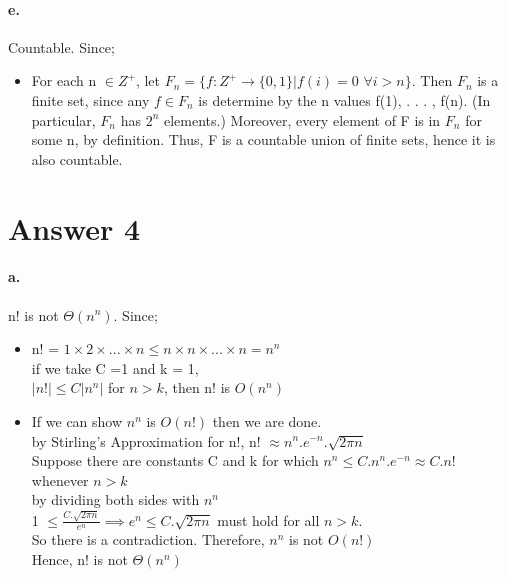 \documentclass[11pt]{article}
\begin{document}
\paragraph{e.}
Countable. Since;
\begin{itemize}
    \item For each n $\in Z^+$, let $F_n = \{f : Z^+ \rightarrow \{0, 1\} | f(i) = 0$ $ \forall i > n\}.$ Then $F_n$ is a finite set, since any $f \in F_n$ is determine by the n values f(1), . . . , f(n). (In particular, $F_n$ has $2^n$ elements.) Moreover, every element of F is in $F_n$ for some n, by definition. Thus, F is a countable union of finite sets, hence it is also countable.
\end{itemize}

\section*{Answer 4}
\paragraph{a.}
n! is not $\Theta(n^n)$. Since;
\begin{itemize}
    \item n! = $1\times2\times...\times n \leq n\times n \times...\times n = n^n$\\
    if we take C =1 and k = 1,\\
    $|n!| \leq C|n^n|$ for $n > k$, then n! is $O(n^n)$
    \item If we can show  $n^n$ is $O(n!)$ then we are done. \\
    by Stirling's Approximation for n!, n! $\approx n^n.e^{-n}.\sqrt{2\pi n}$ \\
    Suppose there are constants C and k for which $n^n \leq C.n^n.e^{-n} \approx C.n!$  whenever $n > k $ \\
    by dividing both sides with $n^n$ \\
    1 $\leq \frac{C.\sqrt{2\pi n}}{e^n} \implies e^n \leq C.\sqrt{2\pi n} $ must hold for all $n > k$. \\ So there is a contradiction. Therefore, $n^n$ is not $O(n!)$ \\
    Hence, n! is not $\Theta(n^n)$
\end{itemize}
\end{document}
